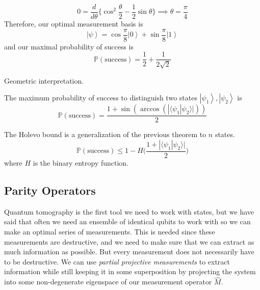 \documentclass{article}
\newcommand{\ket}[1]{\ensuremath{\left|#1\right\rangle}}
\newcommand{\braket}[2]{\langle #1 | #2 \rangle}
\begin{document}
\begin{example}
      \begin{equation}
        0 = \frac{d}{d\theta} \bigg\{ \cos^2 \frac{\theta}{2} - \frac{1}{2} \sin{\theta} \bigg\} \implies  \theta = \frac{\pi}{4}
      \end{equation}
      Therefore, our optimal measurement basis is 
      \begin{equation}
        \ket{\psi} = \cos\frac{\pi}{8} \ket{0} + \sin\frac{\pi}{8} \ket{1} 
      \end{equation}
      and our maximal probability of success is 
      \begin{equation}
        \mathbb{P}(\text{success}) = \frac{1}{2} + \frac{1}{2 \sqrt{2}}
      \end{equation}
    \end{example}

    Geometric interpretation. 

    \begin{theorem}[]
      The maximum probability of success to distinguish two states $\ket{\psi_1}, \ket{\psi_2}$ is 
      \begin{equation}
        \mathbb{P}(\text{success}) = \frac{1 + \sin(\arccos(|\braket{\psi_1}{\psi_2}|))}{2}
      \end{equation}
    \end{theorem}

    \begin{theorem}
      The Holevo bound is a generalization of the previous theorem to $n$ states. 
      \begin{equation}
        \mathbb{P}(\text{success}) \leq 1 - H\bigg( \frac{1 + |\braket{\psi_1}{\psi_2}|}{2} \bigg)
      \end{equation}
      where $H$ is the binary entropy function.
    \end{theorem}


  \subsection{Parity Operators}

    Quantum tomography is the first tool we need to work with states, but we have said that often we need an ensemble of identical qubits to work with so we can make an optimal series of measurements. This is needed since these measurements are destructive, and we need to make sure that we can extract as much information as possible. But every measurement does not necessarily have to be destructive. We can use \textit{partial projective measurements} to extract information while still keeping it in some superposition by projecting the system into some non-degenerate eigenspace of our measurement operator $\hat{M}$. 
\end{document}
